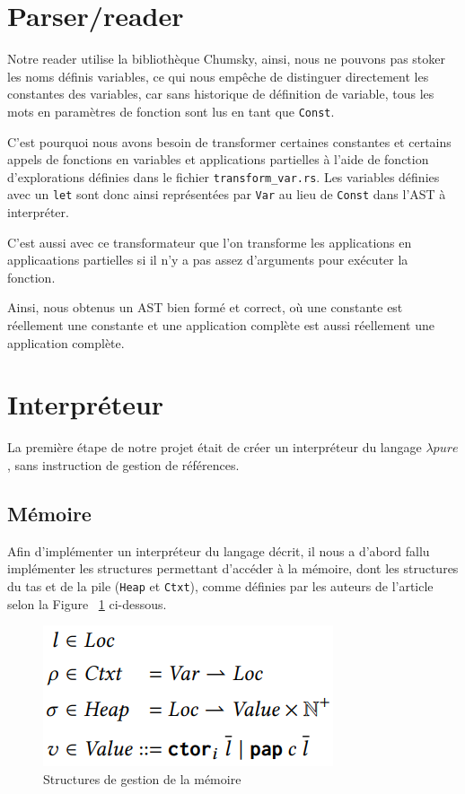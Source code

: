 \documentclass{rapportECL}
\begin{document}
\bigskip

\section{Parser/reader}

Notre reader utilise la bibliothèque Chumsky\cite{zesterer_chumsky_nodate}, ainsi, nous ne pouvons pas stoker les noms définis 
variables, ce qui nous empêche de distinguer directement les constantes des variables, car sans historique de définition de variable, 
tous les mots en paramètres de fonction sont lus en tant que \verb|Const|.

C'est pourquoi nous avons besoin de transformer certaines constantes et certains appels de fonctions en variables et applications partielles à l'aide de 
fonction d'explorations définies dans le fichier \verb|transform_var.rs|.
Les variables définies avec un \verb|let| sont donc ainsi représentées par \verb|Var| au lieu de \verb|Const| dans l'AST à interpréter.

C'est aussi avec ce transformateur que l'on transforme les applications en applicaations partielles si il n'y a pas assez d'arguments
pour exécuter la fonction.

Ainsi, nous obtenus un AST bien formé et correct, où une constante est réellement une constante et une application
complète est aussi réellement une application complète.

\section{Interpréteur}

La première étape de notre projet était de créer un interpréteur du langage $\lambda{pure}$, sans instruction de gestion de références.

\subsection{Mémoire}

Afin d'implémenter un interpréteur du langage décrit, il nous a d'abord fallu implémenter les structures permettant d'accéder à la mémoire, 
dont les structures du tas et de la pile (\verb|Heap| et \verb|Ctxt|), comme définies par les auteurs de l'article selon la Figure ~\ref{fig:memory} ci-dessous.

\begin{figure}[hbt!]
	\centering
	\includegraphics[scale=0.65]{logos/figure_strutures_interpreteur.png}
	\caption{Structures de gestion de la mémoire} 
	\label{fig:memory}
\end{figure}
\FloatBarrier 
\end{document}
